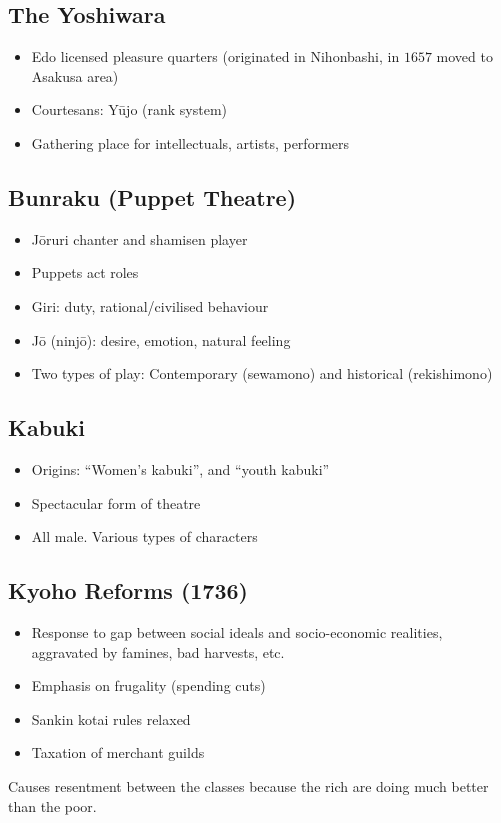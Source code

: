 \documentclass[class=article, crop=false]{standalone}
\begin{document}
  \subsection{The Yoshiwara}
  \begin{itemize}
    \item Edo licensed pleasure quarters (originated in Nihonbashi, in $1657$ moved to Asakusa area)
    \item Courtesans: Y\=ujo (rank system)
    \item Gathering place for intellectuals, artists, performers
  \end{itemize}
  \subsection{Bunraku (Puppet Theatre)}
  \begin{itemize}
    \item J\=oruri chanter and shamisen player
    \item Puppets act roles
    \item Giri: duty, rational/civilised behaviour
    \item J\=o (ninj\=o): desire, emotion, natural feeling
    \item Two types of play: Contemporary (sewamono) and historical (rekishimono)
  \end{itemize}
  \subsection{Kabuki}
  \begin{itemize}
    \item Origins: ``Women's kabuki'', and ``youth kabuki''
    \item Spectacular form of theatre
    \item All male. Various types of characters
  \end{itemize}
  \subsection{Kyoho Reforms (1736)}
  \begin{itemize}
    \item Response to gap between social ideals and socio-economic realities, aggravated by famines, bad harvests, etc.
    \item Emphasis on frugality (spending cuts)
    \item Sankin kotai rules relaxed
    \item Taxation of merchant guilds
  \end{itemize}
  \begin{note}{}
    Causes resentment between the classes because the rich are doing much better than the poor.
  \end{note}
\end{document}
